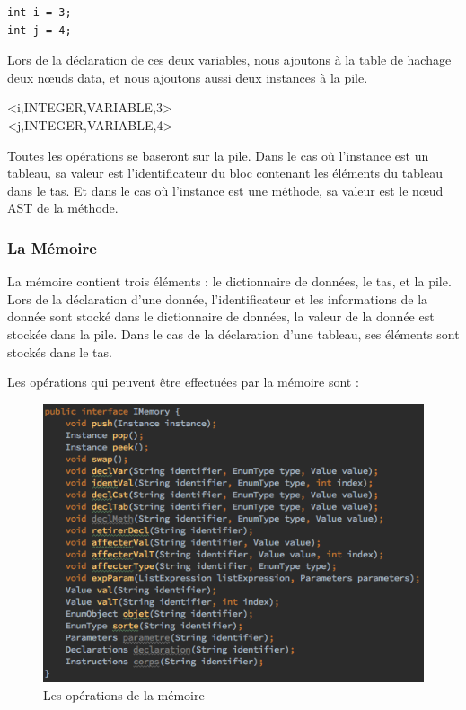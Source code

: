 \documentclass[a4paper,12pt]{report}
\begin{document}
\begin{lstlisting}
int i = 3;
int j = 4;
\end{lstlisting}

Lors de la déclaration de ces deux variables, nous ajoutons à la table de hachage deux nœuds data, et nous ajoutons aussi deux instances à la pile. 

\begin{center}
	\textless i,INTEGER,VARIABLE,3\textgreater \\
	\textless j,INTEGER,VARIABLE,4\textgreater
\end{center}

Toutes les opérations se baseront sur la pile. Dans le cas où l'instance est un tableau, sa valeur est l'identificateur du bloc contenant les éléments du tableau dans le tas. Et dans le cas où l'instance est une méthode, sa valeur est le nœud AST de la méthode.

\subsubsection{La Mémoire}
La mémoire contient trois éléments : le dictionnaire de données, le tas, et la pile. Lors de la déclaration d'une donnée, l'identificateur et les informations de la donnée sont stocké dans le dictionnaire de données, la valeur de la donnée est stockée dans la pile. Dans le cas de la déclaration d'une tableau, ses éléments sont stockés dans le tas.

Les opérations qui peuvent être effectuées par la mémoire sont :

\begin{figure}[H]
\begin{center}
	\includegraphics[scale=0.5]{memoire}
	\caption{Les opérations de la mémoire}
\end{center}
\end{figure}
\end{document}
